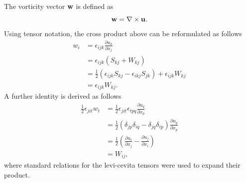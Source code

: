 \documentclass[oneside,a4paper,11pt]{report}
\begin{document}
The vorticity vector $\mathbf{w}$ is defined as
\begin{equation}
\mathbf{w} = \nabla \times \mathbf{u}.
\end{equation}
Using tensor notation, the cross product above can be reformulated as follows
\begin{align}
w_i & = \epsilon_{ijk} \frac{\partial u_k}{\partial x_j} \nonumber \\
& = \epsilon_{ijk} (S_{kj} + W_{kj}) \nonumber \\
& = \frac{1}{2} (\epsilon_{ijk} S_{kj} - \epsilon_{ikj} S_{jk}) + \epsilon_{ijk} W_{kj} \nonumber \\
& = \epsilon_{ijk}W_{kj}.
\end{align}
A further identity is derived as follows
\begin{align}
\frac{1}{2} \epsilon_{jit} w_t &= \frac{1}{2} \epsilon_{jit} \epsilon_{tpq} \frac{\partial u_q}{\partial x_p} \nonumber \\
&= \frac{1}{2} (\delta_{jp} \delta_{iq} - \delta_{jq} \delta_{ip}) \frac{\partial u_q}{\partial x_p} \nonumber \\
&= \frac{1}{2} \left (\frac{\partial u_i}{\partial x_j} - \frac{\partial u_j}{\partial x_i} \right ) \nonumber \\
&= W_{ij},
\end{align}
where standard relations for the levi-cevita tensors were used to expand their product.
\end{document}
